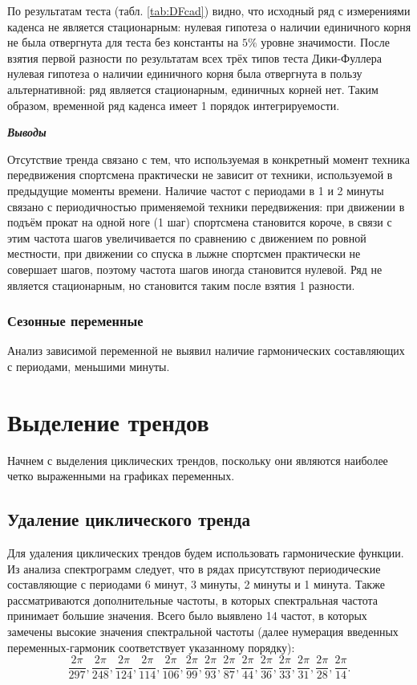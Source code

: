 \documentclass[a4paper,12pt]{article}
\begin{document}
По результатам теста (табл. \ref{tab:DFcad}) видно, что исходный ряд с измерениями каденса не является стационарным: нулевая гипотеза о наличии единичного корня не была отвергнута для теста без константы на $5\%$ уровне значимости. После взятия первой разности по результатам всех трёх типов теста Дики-Фуллера нулевая гипотеза о наличии единичного корня была отвергнута в пользу альтернативной: ряд является стационарным, единичных корней нет. Таким образом, временной ряд каденса имеет 1 порядок интегрируемости. 


\textbf{\textit{Выводы}}

Отсутствие тренда связано с тем, что используемая в конкретный момент техника передвижения спортсмена практически не зависит от техники, используемой в предыдущие моменты времени.
Наличие частот с периодами в 1 и 2 минуты связано с периодичностью применяемой техники передвижения: при движении в подъём прокат на одной ноге (1 шаг) спортсмена становится короче, в связи с этим частота шагов увеличивается по сравнению с движением по ровной местности, при движении со спуска в лыжне спортсмен практически не совершает шагов, поэтому частота шагов иногда становится нулевой. Ряд не является стационарным, но становится таким после взятия 1 разности. %

\subsubsection{Сезонные переменные}
Анализ зависимой переменной не выявил наличие гармонических составляющих с периодами, меньшими минуты.

\section{Выделение трендов}
Начнем с выделения циклических трендов, поскольку они являются наиболее четко выраженными на графиках переменных.

\subsection{Удаление циклического тренда}
Для удаления циклических трендов будем использовать гармонические функции. Из анализа спектрограмм следует, что в рядах присутствуют периодические составляющие с периодами 6 минут, 3 минуты, 2 минуты и 1 минута. Также рассматриваются дополнительные частоты, в которых спектральная частота принимает большие значения. Всего было выявлено 14 частот, в которых замечены высокие значения спектральной частоты (далее нумерация введенных переменных-гармоник соответствует указанному порядку): $$\frac{2 \pi}{297}, \frac{2 \pi}{248}, \frac{2 \pi}{124}, \frac{2 \pi}{114}, \frac{2 \pi}{106}, \frac{2 \pi}{99}, \frac{2 \pi}{93}, \frac{2 \pi}{87}, \frac{2 \pi}{44}, \frac{2 \pi}{36}, \frac{2 \pi}{33}, \frac{2 \pi}{31}, \frac{2 \pi}{28}, \frac{2 \pi}{14}.$$
\end{document}
